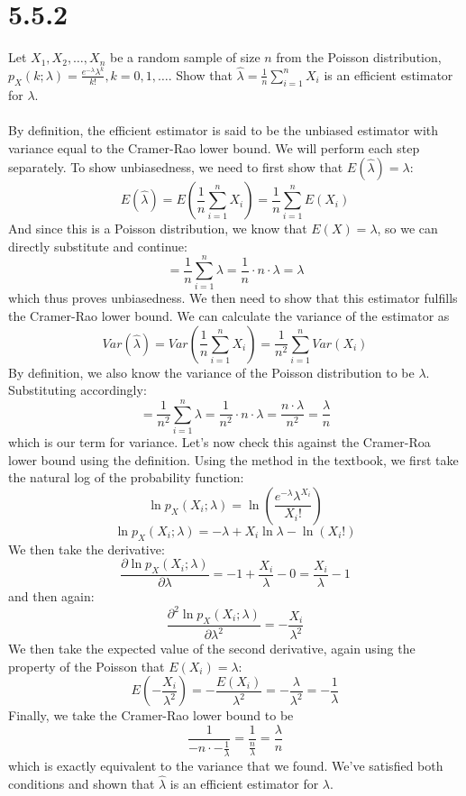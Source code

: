 \documentclass{article}
\begin{document}
{\section*{5.5.2}
Let \(X_1, X_2, \dots, X_n\) be a random sample of size \(n\) from the Poisson distribution, \(p_X(k;\lambda) = \frac{e^{-\lambda}\lambda^k}{k!}, k = 0, 1, \dots\). Show that \(\hat{\lambda} = \frac{1}{n}\sum_{i=1}^{n}X_i\) is an efficient estimator for \(\lambda\).
\\
\\
By definition, the efficient estimator is said to be the unbiased estimator with variance equal to the Cramer-Rao lower bound. We will perform each step separately. To show unbiasedness, we need to first show that \(E(\hat{\lambda}) = \lambda\):
\[
E(\hat{\lambda}) = E(\frac{1}{n}\sum_{i=1}^{n}X_i) = \frac{1}{n}\sum_{i=1}^{n} E(X_i) 
\]
And since this is a Poisson distribution, we know that \(E(X) = \lambda\), so we can directly substitute and continue:
\[
= \frac{1}{n}\sum_{i=1}^{n} \lambda = \frac{1}{n} \cdot n \cdot \lambda = \lambda
\]
which thus proves unbiasedness. We then need to show that this estimator fulfills the Cramer-Rao lower bound. We can calculate the variance of the estimator as 
\[
Var(\hat{\lambda}) = Var(\frac{1}{n}\sum_{i=1}^{n}X_i) = \frac{1}{n^2} \sum_{i=1}^{n} Var(X_i) 
\]
By definition, we also know the variance of the Poisson distribution to be \(\lambda\). Substituting accordingly: 
\[
= \frac{1}{n^2} \sum_{i=1}^{n} \lambda = \frac{1}{n^2} \cdot n \cdot \lambda = \frac{n \cdot \lambda}{n^2} = \frac{\lambda}{n}
\]
which is our term for variance. Let's now check this against the Cramer-Roa lower bound using the definition. Using the method in the textbook, we first take the natural log of the probability function:
\[
\ln p_X(X_i;\lambda) = \ln (\frac{e^{-\lambda}\lambda^{X_i}}{X_i!})
\]
\[
\ln p_X(X_i;\lambda) = -\lambda + X_i \ln \lambda - \ln (X_i!) 
\]
We then take the derivative:
\[
\frac{\partial \ln p_X(X_i;\lambda)}{\partial \lambda} = -1 + \frac{X_i}{\lambda} - 0 = \frac{X_i}{\lambda} - 1
\]
and then again:
\[
\frac{\partial^2 \ln p_X(X_i;\lambda)}{\partial \lambda^2} = -\frac{X_i}{\lambda^2}
\]
We then take the expected value of the second derivative, again using the property of the Poisson that \(E(X_i) = \lambda\):
\[
E(-\frac{X_i}{\lambda^2}) = -\frac{E(X_i)}{\lambda^2} = -\frac{\lambda}{\lambda^2} = -\frac{1}{\lambda}
\]
Finally, we take the Cramer-Rao lower bound to be 
\[
\frac{1}{-n \cdot -\frac{1}{\lambda}} = \frac{1}{\frac{n}{\lambda}} = \frac{\lambda}{n}
\]
which is exactly equivalent to the variance that we found. We've satisfied both conditions and shown that \(\hat{\lambda}\) is an efficient estimator for \(\lambda\).

}
\end{document}
